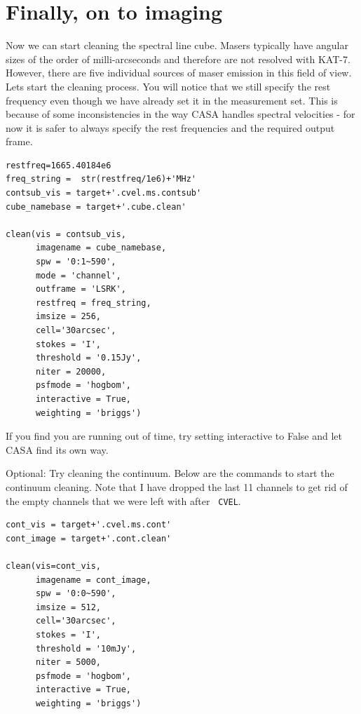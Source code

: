\documentclass[force,almostfull,justified]{tufte-book}
\begin{document}
\section{Finally, on to imaging}

Now we can start cleaning the spectral line cube.  Masers typically have
angular sizes of the order of milli-arcseconds and therefore  are not
resolved with KAT-7.  However, there are five individual sources of
maser emission in this field of view.  Lets start the cleaning process.
You will notice that we still specify the rest frequency even though we
have already set it in the measurement set.  This is because of some
inconsistencies in the way CASA handles spectral velocities - for now it
is safer to always specify the rest frequencies and the required output
frame.

\begin{casacmd}
\begin{verbatim}
restfreq=1665.40184e6
freq_string =  str(restfreq/1e6)+'MHz'
contsub_vis = target+'.cvel.ms.contsub'
cube_namebase = target+'.cube.clean'

clean(vis = contsub_vis,
      imagename = cube_namebase,
      spw = '0:1~590',
      mode = 'channel',
      outframe = 'LSRK',
      restfreq = freq_string,
      imsize = 256,
      cell='30arcsec',
      stokes = 'I',
      threshold = '0.15Jy',
      niter = 20000,
      psfmode = 'hogbom',
      interactive = True,
      weighting = 'briggs')
\end{verbatim}
\end{casacmd}

If you find you are running out of time, try setting interactive to
False and let CASA find its own way.

Optional: Try cleaning the continuum.  Below are the commands to start
the continuum cleaning.  Note that I have dropped the last 11 channels
to get rid of the empty channels that we were left with after {\tt
CVEL}.

\begin{casacmd}
\begin{verbatim}
cont_vis = target+'.cvel.ms.cont'
cont_image = target+'.cont.clean'

clean(vis=cont_vis,
      imagename = cont_image,
      spw = '0:0~590',
      imsize = 512,
      cell='30arcsec',
      stokes = 'I',
      threshold = '10mJy',
      niter = 5000,
      psfmode = 'hogbom',
      interactive = True,
      weighting = 'briggs')
\end{verbatim}
\end{casacmd}
\end{document}
